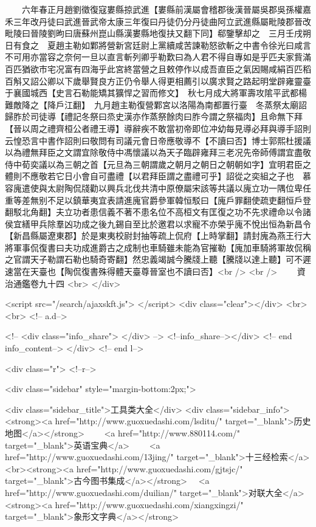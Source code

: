 　　六年春正月趙劉徵復寇婁縣掠武進【婁縣前漢屬會稽郡後漢晉屬吳郡吳孫權嘉禾三年改丹徒曰武進晉武帝太康三年復曰丹徒仍分丹徒曲阿立武進縣屬毗陵郡晉改毗陵曰晉陵劉昫曰唐蘇州崑山縣漢婁縣地復扶又翻下同】郗鑒擊却之　三月壬戌朔日有食之　夏趙主勒如鄴將營新宮廷尉上黨續咸苦諫勒怒欲斬之中書令徐光曰咸言不可用亦當容之奈何一旦以直言斬列卿乎勒歎曰為人君不得自專如是乎匹夫家貲滿百匹猶欲市宅况富有四海乎此宮終當營之且敕停作以成吾直臣之氣因賜咸絹百匹稻百斛又詔公卿以下歲舉賢良方正仍令舉人得更相薦引以廣求賢之路起明堂辟雍靈臺于襄國城西【史言石勒能矯其獷悍之習而修文】　秋七月成大將軍壽攻隂平武都楊難敵降之【降戶江翻】　九月趙主勒復營鄴宮以洛陽為南都置行臺　冬蒸祭太廟詔歸胙於司徒導【禮記冬祭曰烝史漢亦作蒸祭餘肉曰胙今謂之祭福肉】且命無下拜【晉以周之禮齊桓公者禮王導】導辭疾不敢當初帝即位冲幼每見導必拜與導手詔則云惶恐言中書作詔則曰敬問有司議元會日帝應敬導不【不讀曰否】博士郭熙杜援議以為禮無拜臣之文謂宜除敬侍中馮懷議以為天子臨辟雍拜三老况先帝師傅謂宜盡敬侍中荀奕議以為三朝之首【元旦為三朝謂歲之朝月之朝日之朝朝如字】宜明君臣之體則不應敬若它日小會自可盡禮【以君拜臣謂之盡禮可乎】詔從之奕組之子也　慕容廆遣使與太尉陶侃牋勸以興兵北伐共清中原僚屬宋該等共議以廆立功一隅位卑任重等差無别不足以鎮華夷宜表請進廆官爵參軍韓恒駁曰【廆戶罪翻使疏吏翻恒戶登翻駁北角翻】夫立功者患信義不著不患名位不高桓文有匡復之功不先求禮命以令諸侯宜繕甲兵除羣凶功成之後九錫自至比於邀君以求寵不亦榮乎廆不悅出恒為新昌令【新昌縣屬遼東郡】於是東夷校尉封抽等疏上侃府【上時掌翻】請封廆為燕王行大將軍事侃復書曰夫功成進爵古之成制也車騎雖未能為官摧勒【廆加車騎將軍故侃稱之官謂天子勒謂石勒也騎奇寄翻】然忠義竭誠今騰牋上聽【騰牋以達上聽】可不遲速當在天臺也【陶侃復書殊得體天臺尊晉室也不讀曰否】<br />
<br />
　　資治通鑑卷九十四  <br>
   </div> 

<script src="/search/ajaxskft.js"> </script>
 <div class="clear"></div>
<br>
<br>
 <!-- a.d-->

 <!--
<div class="info_share">
</div> 
-->
 <!--info_share--></div>   <!-- end info_content-->
  </div> <!-- end l-->

<div class="r">   <!--r-->



<div class="sidebar"  style="margin-bottom:2px;">

 
<div class="sidebar_title">工具类大全</div>
<div class="sidebar_info">
<strong><a href="http://www.guoxuedashi.com/lsditu/" target="_blank">历史地图</a></strong>　　
<a href="http://www.880114.com/" target="_blank">英语宝典</a>　　
<a href="http://www.guoxuedashi.com/13jing/" target="_blank">十三经检索</a>　
<br><strong><a href="http://www.guoxuedashi.com/gjtsjc/" target="_blank">古今图书集成</a></strong>　
<a href="http://www.guoxuedashi.com/duilian/" target="_blank">对联大全</a>　<strong><a href="http://www.guoxuedashi.com/xiangxingzi/" target="_blank">象形文字典</a></strong>　

